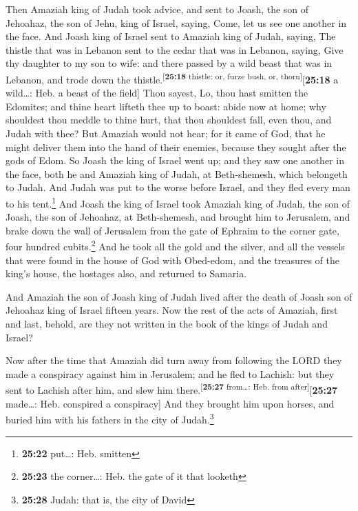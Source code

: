  Then Amaziah king of Judah took advice, and sent to
Joash, the son of Jehoahaz, the son of Jehu, king of Israel, saying,
Come, let us see one another in the face.  And Joash king
of Israel sent to Amaziah king of Judah, saying, The thistle that was in
Lebanon sent to the cedar that was in Lebanon, saying, Give thy daughter
to my son to wife: and there passed by a wild beast that was in Lebanon,
and trode down the thistle.\textsuperscript{{[}\textbf{25:18} thistle:
or, furze bush, or, thorn{]}}{[}\textbf{25:18} a wild\ldots: Heb. a
beast of the field{]}  Thou sayest, Lo, thou hast smitten
the Edomites; and thine heart lifteth thee up to boast: abide now at
home; why shouldest thou meddle to thine hurt, that thou shouldest fall,
even thou, and Judah with thee?  But Amaziah would not
hear; for it came of God, that he might deliver them into the hand of
their enemies, because they sought after the gods of Edom.
 So Joash the king of Israel went up; and they saw one
another in the face, both he and Amaziah king of Judah, at Beth-shemesh,
which belongeth to Judah.  And Judah was put to the worse
before Israel, and they fled every man to his tent.\footnote{\textbf{25:22}
  put\ldots: Heb. smitten}  And Joash the king of Israel
took Amaziah king of Judah, the son of Joash, the son of Jehoahaz, at
Beth-shemesh, and brought him to Jerusalem, and brake down the wall of
Jerusalem from the gate of Ephraim to the corner gate, four hundred
cubits.\footnote{\textbf{25:23} the corner\ldots: Heb. the gate of it
  that looketh}  And he took all the gold and the silver,
and all the vessels that were found in the house of God with Obed-edom,
and the treasures of the king's house, the hostages also, and returned
to Samaria.

 And Amaziah the son of Joash king of Judah lived after
the death of Joash son of Jehoahaz king of Israel fifteen years.
 Now the rest of the acts of Amaziah, first and last,
behold, are they not written in the book of the kings of Judah and
Israel?

 Now after the time that Amaziah did turn away from
following the LORD they made a conspiracy against him in Jerusalem; and
he fled to Lachish: but they sent to Lachish after him, and slew him
there.\textsuperscript{{[}\textbf{25:27} from\ldots: Heb. from
after{]}}{[}\textbf{25:27} made\ldots: Heb. conspired a conspiracy{]}
 And they brought him upon horses, and buried him with
his fathers in the city of Judah.\footnote{\textbf{25:28} Judah: that
  is, the city of David}


